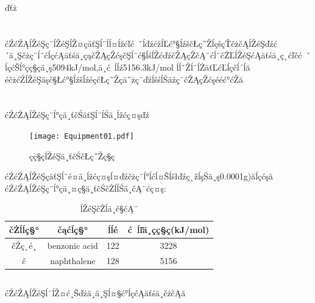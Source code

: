 ďťż\documentclass[10.5pt]{article}
\begin{document}
\title{\textbf{}} %
\author{}
\date{}
\maketitle
\section{\textbf{}}
ćŹćŹĄĺŽéŞç¨ĺŽéŞĺŽ¤çäťŞĺ¨ĺĺ¤ĺžćľć ˇĺďźćžĺĽć°§ĺźščŁç˝ŽĺçšçŤčżčĄĺŽéŞďźć´ä¸Şčżç¨ĺ¨ćĺçćĄäťśä¸çąčŽĄçŽćşčŞĺ¨ć§ĺśĺŽćďźčŽĄçŽčĄ¨ćĺ¨čŻĽĺŽéŞćĄäťśä¸ç˛ćľčć ˇĺçćŠĺ°çç§çä¸ş5094kJ/mol,ä¸ć ĺĺź5156.3kJ/mol ĺĺˇŽĺ¨ĺŻäťĽćĽĺçčĺ´ĺă
éčżćŹĺŽéŞäşč§Łć°§ĺźšĺźéç­čŁç˝Žçä˝żç¨ďźĺšśĺ­Śäźç¨čŽĄçŽćşééć°ćŽă
\section{\textbf{}}
\subsection{\textbf{}}
ćŹćŹĄĺŽéŞç¨ĺ°çä¸ťčŚäťŞĺ¨ĺŚä¸ĺžćç¤şďź
\begin{figure}[!ht]
\centering
\caption{çç§ç­ĺŽéŞä¸ťčŚčŁç˝Žç§ç}
\texttt{[image: Equipment01.pdf]}
\end{figure}


ćŹćŹĄĺŽéŞçäťŞĺ¨é¤ä¸ĺžćç¤şĺ¤ďźčżç¨ĺ°ĺćĺ¤Šĺšłďźç˛žĺşŚä¸ş0.0001g)ăĺçćşă
ćŹćŹĄĺŽéŞç¨ĺ°çä¸¤ç§ä¸ťčŚčŻĺĺŚä¸čĄ¨ćç¤ş:
\newpage
\begin{table}[!ht]
\centering
\caption{ĺŽéŞčŻĺä¸č§čĄ¨}
\begin{tabular}{cccc}
\hline
čŻĺĺç§° & čąćĺç§° & ĺĺ­é & ć ĺľä¸çç§ç(kJ/mol)\\
\hline
čŻç˛é¸ & benzonic acid & 122 & 3228\\
č & naphthalene & 128 & 5156 \\
\hline
\end{tabular}
\end{table}


\subsection{\textbf{}}
ćŹćŹĄĺŽéŞĺ¨ĺŽ¤ć¸Šďźä¸ä¸Şĺ¤§ć°ĺçćĄäťśä¸čżčĄă
\end{document}
